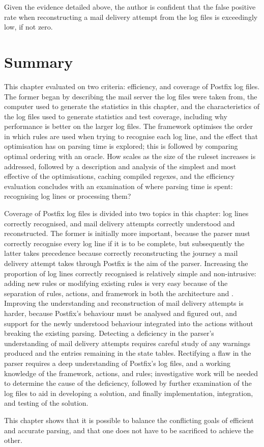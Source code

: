 Given the evidence detailed above, the author is confident that the false
positive rate when reconstructing a mail delivery attempt from the
\numberOFlogFILES{} log files is exceedingly low, if not zero.

\section{Summary}

This chapter evaluated \parsername{} on two criteria: efficiency, and
coverage of Postfix log files.  The former began by describing the mail
server the log files were taken from, the computer used to generate the
statistics in this chapter, and the characteristics of the
\numberOFlogFILES{} log files used to generate statistics and test
coverage, including why performance is better on the larger log files.  The
framework optimises the order in which rules are used when trying to
recognise each log line, and the effect that optimisation has on parsing
time is explored; this is followed by comparing optimal ordering with an
oracle.  How \parsername{} scales as the size of the ruleset increases is
addressed, followed by a description and analysis of the simplest and most
effective of the optimisations, caching compiled regexes, and the
efficiency evaluation concludes with an examination of where parsing time
is spent: recognising log lines or processing them?

Coverage of Postfix log files is divided into two topics in this chapter:
log lines correctly recognised, and mail delivery attempts correctly
understood and reconstructed.  The former is initially more important,
because the parser must correctly recognise every log line if it is to be
complete, but subsequently the latter takes precedence because correctly
reconstructing the journey a mail delivery attempt takes through Postfix is
the aim of the parser.  Increasing the proportion of log lines correctly
recognised is relatively simple and non-intrusive: adding new rules or
modifying existing rules is very easy because of the separation of rules,
actions, and framework in both the architecture and \parsername{}.
Improving the understanding and reconstruction of mail delivery attempts is
harder, because Postfix's behaviour must be analysed and figured out, and
support for the newly understood behaviour integrated into the actions
without breaking the existing parsing.  Detecting a deficiency in the
parser's understanding of mail delivery attempts requires careful study of
any warnings produced and the entries remaining in the state tables.
Rectifying a flaw in the parser requires a deep understanding of Postfix's
log files, and a working knowledge of the framework, actions, and rules;
investigative work will be needed to determine the cause of the deficiency,
followed by further examination of the log files to aid in developing a
solution, and finally implementation, integration, and testing of the
solution.

This chapter shows that it is possible to balance the conflicting goals of
efficient and accurate parsing, and that one does not have to be sacrificed
to achieve the other.
